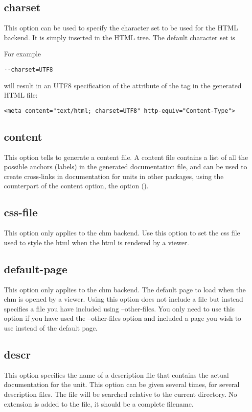 \subsection{charset}
\label{suse:charset}
This option can be used to specify the character set to be used for
the HTML backend. It is simply inserted in the HTML tree. The default
character set is 

For example
\begin{verbatim}
--charset=UTF8
\end{verbatim}
will result in an UTF8 specification of the  attribute of 
the  tag in the generated HTML file:
\begin{verbatim}
<meta content="text/html; charset=UTF8" http-equiv="Content-Type">
\end{verbatim}

\subsection{content}
\label{suse:content}
This option tells  \fpdoc to generate a content file. 
A content file contains a list of all the
possible anchors (labels) in the generated documentation file, and can be
used to create cross-links in documentation for units in other packages, 
using the counterpart of the content option, the  option
().

\subsection{css-file}
\label{suse:css-file}
This option only applies to the chm backend. Use this option to set the css
file used to style the html when the html is rendered by a viewer.

\subsection{default-page}
\label{suse:default-page}
This option only applies to the chm backend. The default page to load 
when the chm is opened by a viewer. Using this option does not include a file
but instead specifies a file you have included using --other-files. You only 
need to use this option if you have used the --other-files option and included 
a page you wish to use instead of the default page.

\subsection{descr}
\label{suse:descr}
This option specifies the name of a description file that contains the 
actual documentation for the unit. This option can be given several 
times, for several description files. The file will be searched relative to
the current directory. No extension is added to the file, it should be a
complete filename.

